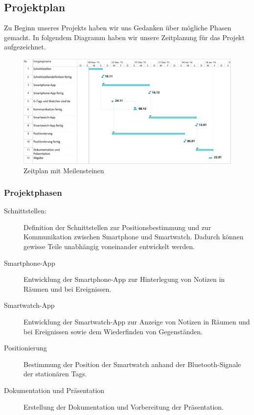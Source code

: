 \subsection{Projektplan}
Zu Beginn unseres Projekts haben wir uns Gedanken über mögliche Phasen gemacht. In folgendem Diagramm haben wir unsere Zeitplanung für das Projekt aufgezeichnet.

\begin{figure}[tbh]
\centering
\includegraphics[width=1.0\linewidth]{Bilder/Projektplan}
\caption{Zeitplan mit Meilensteinen}
\label{fig:Zeitplan-1}
\end{figure}

\subsubsection{Projektphasen}
\begin{description}
	\item[Schnittstellen:] Definition der Schnittstellen zur Positionsbestimmung und zur Kommunikation zwischen
	Smartphone und Smartwatch. Dadurch können gewisse Teile unabhängig voneinander entwickelt werden.
	\item[Smartphone-App] Entwicklung der Smartphone-App zur Hinterlegung von Notizen in Räumen und bei Ereignissen.
	\item[Smartwatch-App] Entwicklung der Smartwatch-App zur Anzeige von Notizen in Räumen und bei Ereignissen sowie
	dem Wiederfinden von Gegenständen.
	\item[Positionierung] Bestimmung der Position der Smartwatch anhand der Bluetooth-Signale der stationären Tags.
	\item[Dokumentation und Präsentation] Erstellung der Dokumentation und Vorbereitung der Präsentation.
\end{description}

